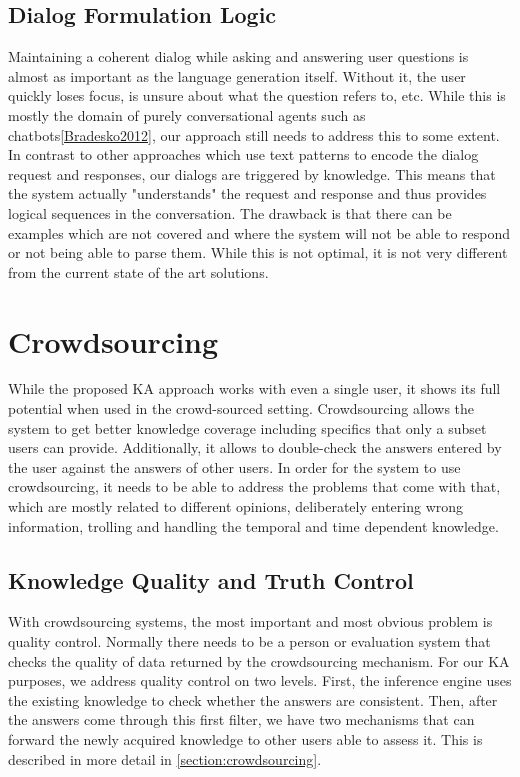\subsection{Dialog Formulation Logic}
Maintaining a coherent dialog while asking and answering user questions is 
almost as important as the language generation itself. Without it, the user 
quickly loses focus, is unsure about what the question refers to, etc. 
While this is mostly the domain of purely conversational agents such as 
chatbots\autoref{Bradesko2012}, our approach still needs to address this to 
some extent. In contrast to other approaches which use text patterns to encode 
the dialog request and responses, our dialogs are triggered by knowledge. 
This means that the system actually "understands" the request and response and 
thus provides logical sequences in the conversation. The drawback is that there
can be examples which are not covered and where the system will not be able to
respond or not being able to parse them. While this is not optimal, it is not 
very different from the current state of the art solutions.

\section{Crowdsourcing}
\label{section:bg:crowdsourcing}
While the proposed KA approach works with even a single user, it shows its 
full potential when used in the crowd-sourced setting. Crowdsourcing allows 
the system to get better knowledge coverage including specifics that only a 
subset users can provide. Additionally, it allows to double-check the answers 
entered by the user against the answers of other users. In order for the system 
to use crowdsourcing, it needs to be able to address the problems that come 
with that, which are mostly related to different opinions, deliberately entering 
wrong information, trolling and handling the temporal and time dependent 
knowledge.

\subsection{Knowledge Quality and Truth Control} 
With crowdsourcing systems, the most important and most obvious problem is 
quality control. Normally there needs to be a person or evaluation system that 
checks the quality of data returned by the crowdsourcing mechanism. For our 
KA purposes, we address quality control on two levels. First, the inference 
engine uses the existing knowledge to check whether the answers are consistent. 
Then, after the answers come through this first filter, we have two mechanisms 
that can forward the newly acquired knowledge to other users able to assess it. 
This is described in more detail in \autoref{section:crowdsourcing}.


